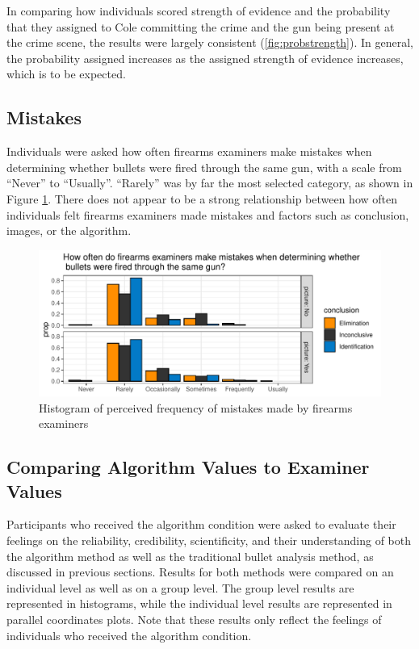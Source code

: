 \documentclass[print]{nuthesis}
\begin{document}
In comparing how individuals scored strength of evidence and the probability that they assigned to Cole committing the crime and the gun being present at the crime scene, the results were largely consistent (\ref{fig:probstrength}).
In general, the probability assigned increases as the assigned strength of evidence increases, which is to be expected.

\hypertarget{mistakes}{%
\subsection{Mistakes}\label{mistakes}}

Individuals were asked how often firearms examiners make mistakes when determining whether bullets were fired through the same gun, with a scale from ``Never'' to ``Usually''.
``Rarely'' was by far the most selected category, as shown in Figure \ref{fig:mistakes}.
There does not appear to be a strong relationship between how often individuals felt firearms examiners made mistakes and factors such as conclusion, images, or the algorithm.

\begin{figure}

{\centering \includegraphics[width=\linewidth]{thesis_files/figure-latex/mistakes-1} 

}

\caption{Histogram of perceived frequency of mistakes made by firearms examiners}\label{fig:mistakes}
\end{figure}

\hypertarget{comparing-algorithm-values-to-examiner-values}{%
\subsection{Comparing Algorithm Values to Examiner Values}\label{comparing-algorithm-values-to-examiner-values}}

Participants who received the algorithm condition were asked to evaluate their feelings on the reliability, credibility, scientificity, and their understanding of both the algorithm method as well as the traditional bullet analysis method, as discussed in previous sections.
Results for both methods were compared on an individual level as well as on a group level.
The group level results are represented in histograms, while the individual level results are represented in parallel coordinates plots.
Note that these results only reflect the feelings of individuals who received the algorithm condition.
\end{document}
